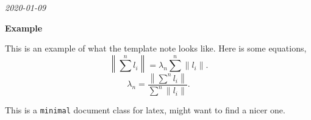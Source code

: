 \documentclass[10pt,numbers=noenddot]{minimal}
\begin{document}
\newcommand{\norm}[1]{\left\lVert#1\right\rVert}

\vspace*{\fill}

\begin{flushright}\textit{2020-01-09}\end{flushright}
\textbf{Example}

This is an example of what the template note looks like.
Here is some equations,
\[
    \norm{\sum^{n}l_i} = \lambda_n\sum^{n}\norm{l_i}
.\]
\[
    \lambda_n = \frac{\norm{\sum^{n}l_i}}{\sum^{n}\norm{l_i}}
.\]

This is a \texttt{minimal} document class for latex, might want to find a nicer one.

\vspace*{\fill}
\end{document}

